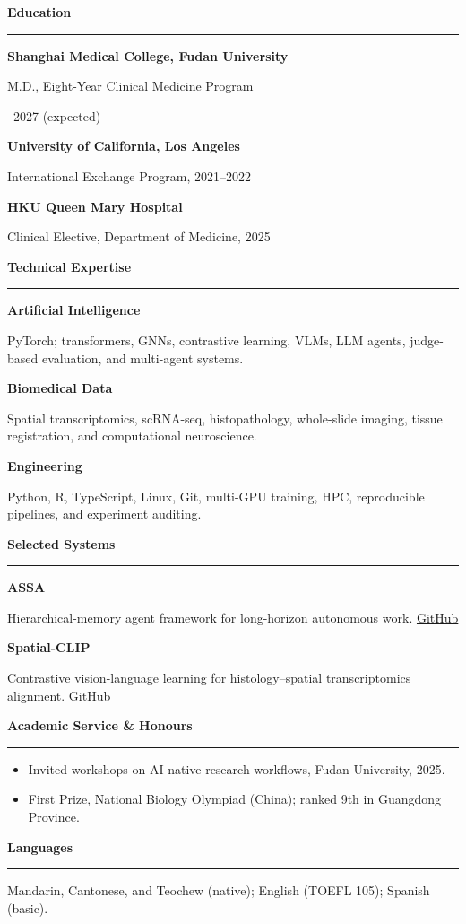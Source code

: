 \documentclass[10pt,a4paper]{article}
\newcommand{\sidehead}[1]{%
  \vspace{0.50em}%
  {\fontsize{9.8}{10.8}\selectfont\bfseries\color{Navy}#1}\par
  \vspace{0.12em}\color{Rule}\rule{\linewidth}{0.45pt}\color{Ink}\vspace{0.20em}
}
\newcommand{\sidetitle}[1]{{\fontsize{8.95}{10.35}\selectfont\bfseries\color{Ink}#1}}
\newcommand{\sidebody}[1]{{\fontsize{8.65}{10.3}\selectfont\color{Muted}\RaggedRight #1}}
\newcommand{\sideitem}[1]{\item {\fontsize{8.55}{10.15}\selectfont\RaggedRight #1}}
\newenvironment{sideitems}{%
  \begin{itemize}[leftmargin=1.05em,itemsep=0.12em,topsep=0.20em,parsep=0pt,partopsep=0pt,label=\textcolor{Teal}{\raisebox{0.14ex}{\tiny\textbullet}}]
}{\end{itemize}}
\begin{document}
\noindent
\begin{minipage}[t]{0.315\textwidth}
\vspace{0pt}
\RaggedRight

\sidehead{Education}
\sidetitle{Shanghai Medical College, Fudan University}\par
\sidebody{M.D., Eight-Year Clinical Medicine Program}\par
\sidebody{2019--2027 (expected)}\par
\vspace{0.26em}
\sidetitle{University of California, Los Angeles}\par
\sidebody{International Exchange Program, 2021--2022}\par
\vspace{0.26em}
\sidetitle{HKU Queen Mary Hospital}\par
\sidebody{Clinical Elective, Department of Medicine, 2025}\par

\sidehead{Technical Expertise}
\sidetitle{Artificial Intelligence}\par
\sidebody{PyTorch; transformers, GNNs, contrastive learning, VLMs, LLM agents, judge-based evaluation, and multi-agent systems.}\par
\vspace{0.30em}
\sidetitle{Biomedical Data}\par
\sidebody{Spatial transcriptomics, scRNA-seq, histopathology, whole-slide imaging, tissue registration, and computational neuroscience.}\par
\vspace{0.30em}
\sidetitle{Engineering}\par
\sidebody{Python, R, TypeScript, Linux, Git, multi-GPU training, HPC, reproducible pipelines, and experiment auditing.}\par

\sidehead{Selected Systems}
\sidetitle{ASSA}\par
\sidebody{Hierarchical-memory agent framework for long-horizon autonomous work. \href{https://github.com/Biogod2020/ASSA}{GitHub}}\par
\vspace{0.30em}
\sidetitle{Spatial-CLIP}\par
\sidebody{Contrastive vision-language learning for histology--spatial transcriptomics alignment. \href{https://github.com/Biogod2020/Spatial-Clip}{GitHub}}\par

\sidehead{Academic Service \& Honours}
\begin{sideitems}
  \sideitem{Invited workshops on AI-native research workflows, Fudan University, 2025.}
  \sideitem{First Prize, National Biology Olympiad (China); ranked 9th in Guangdong Province.}
\end{sideitems}

\sidehead{Languages}
\sidebody{Mandarin, Cantonese, and Teochew (native); English (TOEFL 105); Spanish (basic).}\par
\end{minipage}
\end{document}
